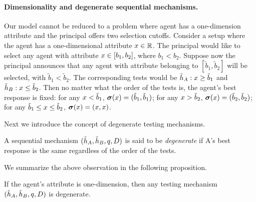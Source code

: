 
\paragraph{Dimensionality and degenerate sequential mechanisms.}
Our model cannot be reduced to a problem where agent has a one-dimension attribute and the principal offers two selection cutoffs.
Consider a setup where the agent has a one-dimensional attribute $x\in \mathbb{R}$.
The principal would like to select any agent with attribute $x\in [b_1,b_2]$, where $b_1<b_2$.
Suppose now the principal announces that any agent with attribute belonging to $[\tilde b_1,\tilde b_2]$ will be selected, with $\tilde b_1<\tilde b_2$. 
The corresponding tests would be $\tilde{h}_A: x\geq \tilde b_1$ and $\tilde{h}_B: x\leq \tilde b_2$.
Then no matter what the order of the tests is, the agent's best response is fixed: for any $x < \tilde b_1$, $\boldsymbol{\sigma}(x)=(\tilde b_1,\tilde b_1)$; for any $x > \tilde b_2$, $\boldsymbol{\sigma}(x)=(\tilde b_2,\tilde b_2)$; for any $\tilde b_1\leq x \leq \tilde b_2$, $\boldsymbol{\sigma}(x)=(x,x)$.

Next we introduce the concept of degenerate testing mechanisms. 
\begin{definition}
	A sequential mechanism $(\tilde{h}_A,\tilde{h}_B,q,D)$ is said to be \emph{degenerate} if A's best response is the same regardless of the order of the tests.
\end{definition}

We summarize the above observation in the following proposition.
\begin{proposition}
	If the agent's attribute is one-dimension, then any testing mechanism $(\tilde{h}_A,\tilde{h}_B,q,D)$ is degenerate.
\end{proposition}

